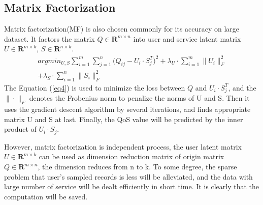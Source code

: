 \documentclass[conference]{IEEEtran}
\begin{document}
\subsection{Matrix Factorization}
Matrix factorization(MF) is also chosen commonly for its accuracy on large dataset. It factors the matrix $Q\in \textbf{R}^{m \times n} $ into user and service latent matrix $U\in \textbf{R}^{m \times k}$, $S \in \textbf{R}^{n \times k}$. 
\begin{equation}
\begin{aligned}
argmin_{U,S} \sum_{i=1}^{m}{\sum_{j=1}^{n}{
(Q_{ij}-U_{i} \cdot S_{j}^{T}})^{2}
}
 + \lambda_{U} \cdot \sum_{i=1}^{m}\|U_{i}\|_{F}^{2} \\
+ \lambda_{S} \cdot \sum_{i=1}^{n}\|S_{i}\|_{F}^{2}
\label{eq4}
\end{aligned}
\end{equation}
The Equation (\ref{eq4}) is used to minimize the loss between $Q$ and 
$U_{i} \cdot S_{j}^{T}$, and the $\| \cdot \|_{F}$ denotes the Frobenius norm\cite{chen_user_2016} to penalize the norms of U and S. Then it uses the gradient descent algorithm by several iterations, and finds appropriate matrix U and S at last. Finally, the QoS value will be predicted by the inner product of $U_{i} \cdot S_{j}$. 
\par However, matrix factorization is independent process, the user latent matrix $U \in \textbf{R}^{m \times k}$ can be used as dimension reduction matrix of origin matrix $Q \in \textbf{R}^{m \times n}$, the dimension reduces from n to k. To some degree, the sparse problem that user's sampled records is less will be alleviated, and the data with large number of service will be dealt efficiently in short time. It is clearly that the computation will be saved.
\end{document}
